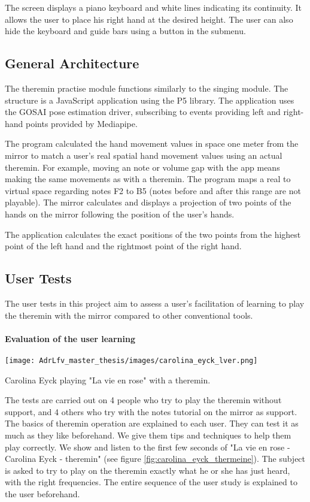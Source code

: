 The screen displays a piano keyboard and white lines indicating its continuity. It allows the user to place his right hand at the desired height. The user can also hide the keyboard and guide bars using a button in the submenu.

\subsection{General Architecture}

The theremin practise module functions similarly to the singing module. The structure is a JavaScript application using the P5 library. The application uses the GOSAI pose estimation driver, subscribing to events providing left and right-hand points provided by Mediapipe.

The program calculated the hand movement values in space one meter from the mirror to match a user's real spatial hand movement values using an actual theremin. For example, moving an note or volume gap with the app means making the same movements as with a theremin. The program maps a real to virtual space regarding notes F2 to B5 (notes before and after this range are not playable). The mirror calculates and displays a projection of two points of the hands on the mirror following the position of the user's hands.

The application calculates the exact positions of the two points from the highest point of the left hand and the rightmost point of the right hand.

\subsection*{User Tests}

The user tests in this project aim to assess a user’s facilitation of learning to play the theremin with the mirror compared to other conventional tools.

\paragraph{Evaluation of the user learning}

\begin{marginfigure}
    \centering
    \texttt{[image: AdrLfv\_master\_thesis/images/carolina\_eyck\_lver.png]}
    \caption{Carolina Eyck playing "La vie en rose" with a theremin.}
    \label{fig:carolina_eyck_thermeine}
\end{marginfigure}

The tests are carried out on 4 people who try to play the theremin without support, and 4 others who try with the notes tutorial on the mirror as support.
The basics of theremin operation are explained to each user. They can test it as much as they like beforehand. We give them tips and techniques to help them play correctly. We show and listen to the first few seconds of "La vie en rose - Carolina Eyck - theremin" (see figure \ref{fig:carolina_eyck_thermeine}).
The subject is asked to try to play on the theremin exactly what he or she has just heard, with the right frequencies. 
The entire sequence of the user study is explained to the user beforehand.

